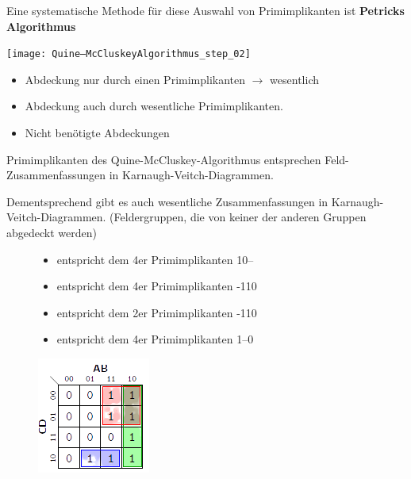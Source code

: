 \documentclass[12pt]{report}
\begin{document}
\begin{enumerate}
\begin{itemize}
                Eine systematische Methode für diese Auswahl von Primimplikanten ist \textbf{Petricks Algorithmus}
        \end{itemize}
        \begin{center}
          \texttt{[image: Quine–McCluskeyAlgorithmus\_step\_02]}
        \end{center}
        
        \begin{itemize}
          \item[\color{red} $\bullet$ ] Abdeckung nur durch einen Primimplikanten $\rightarrow$ wesentlich
          \item[\color{blue} $\bullet$ ] Abdeckung auch durch wesentliche Primimplikanten.
          \item[\color{gray} $\bullet$ ] Nicht benötigte Abdeckungen
        \end{itemize}
\end{enumerate}


\begin{infobox}
  Primimplikanten des Quine-McCluskey-Algorithmus entsprechen 
  Feld-Zusammenfassungen in Karnaugh-Veitch-Diagrammen.
  
  Dementsprechend gibt es auch wesentliche Zusammenfassungen in Karnaugh-Veitch-Diagrammen. 
  (Feldergruppen, die von keiner der anderen Gruppen abgedeckt werden)
\end{infobox}
\begin{figure}[h]
  \begin{minipage}{0.6\textwidth}
    \begin{itemize}
      \item[\color{green} Grün] entspricht dem 4er Primimplikanten 10--
      \item[\color{red} Rot\ ] entspricht dem 4er Primimplikanten -110
      \item[\color{blue} Blau] entspricht dem 2er Primimplikanten -110
      \item[\color{yellow} Gelb] entspricht dem 4er Primimplikanten 1--0
    \end{itemize}
  \end{minipage}
  \hfill
  \begin{minipage}{0.4\textwidth}
    \includegraphics{karnaugh-veitch-step_03}
  \end{minipage}
\end{figure}
\end{document}
